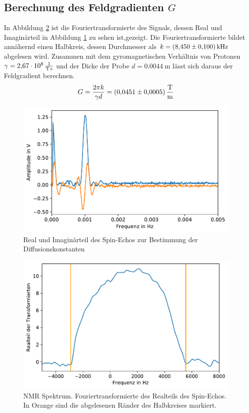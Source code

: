 \subsection{Berechnung des Feldgradienten $G$}
In Abbildung \ref{fig:fourier} ist die Fouriertransformierte des Signals, dessen Real und Imaginärteil in Abbildung \ref{fig:df58_59} zu sehen ist,gezeigt.
Die Fouriertransformierte bildet annähernd einen Halbkreis, dessen Durchmesser als $k = \SI{8.450 +- 0.10}{\kilo\hertz}$ abgelesen wird.
Zusammen mit dem gyromagnetischen Verhältnis von Protonen  $\gamma = \SI[per-mode=fraction]{2.67E08}{\per\tesla\per\second}$ und der Dicke der Probe $d = \SI{0.0044}{\metre}$ lässt sich daraus der Feldgradient berechnen.
\begin{equation}
    G = \frac{2\pi k}{\gamma d} = \SI{0.0451+-0.0005}{\tesla\per\metre}
\end{equation}
\begin{figure}[ht]
    \center
    \includegraphics[scale = 0.75]{plots/df58_59.pdf}
    \caption{Real und Imaginärteil des Spin-Echos zur Bestimmung der Diffusionskonstanten}
    \label{fig:df58_59}
\end{figure}
\begin{figure}[ht]
    \center
    \includegraphics[scale = 0.75]{plots/fourier.pdf}
    \caption{NMR Spektrum. Fouriertransformierte des Realteils des Spin-Echos. In Orange sind die abgelesenen Ränder des Halbkreises markiert.}
    \label{fig:fourier}
\end{figure}

